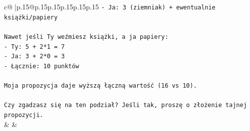 \documentclass{article}
\begin{document}
{\begin{supertabular}{c@{$\;$}|p{.15\linewidth}@{}p{.15\linewidth}p{.15\linewidth}p{.15\linewidth}p{.15\linewidth}p{.15\linewidth}}
{{{\texttt{{-} Ja: 3 (ziemniak) + ewentualnie książki/papiery} \\
\\ 
\texttt{Nawet jeśli Ty weźmiesz książki, a ja papiery:} \\
\texttt{{-} Ty: 5 + 2*1 = 7} \\
\texttt{{-} Ja: 3 + 2*0 = 3} \\
\texttt{{-} Łącznie: 10 punktów} \\
\\ 
\texttt{Moja propozycja daje wyższą łączną wartość (16 vs 10).} \\
\\ 
\texttt{Czy zgadzasz się na ten podział? Jeśli tak, proszę o złożenie tajnej propozycji.} \\
            }
        }
    }
    & & \\ \\


\end{supertabular}}
\end{document}
